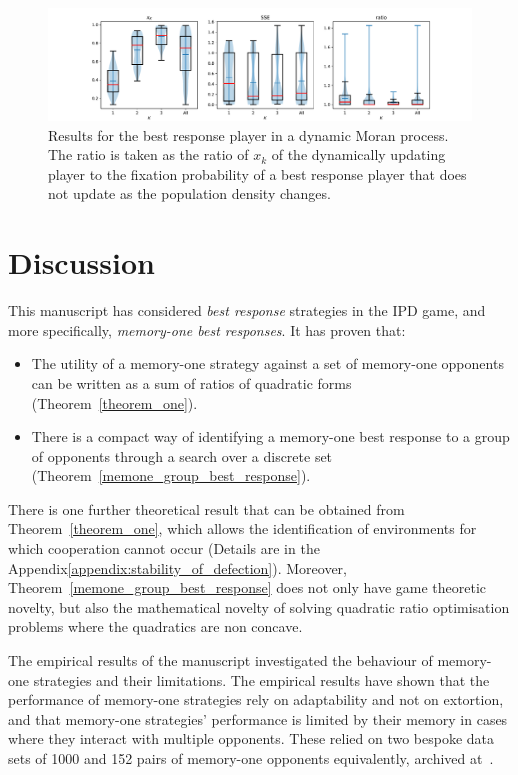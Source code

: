 \documentclass[10pt]{article}
\begin{document}
\begin{figure}[!hbtp]
    \centering
    \includegraphics[width=.9\textwidth]{img/dynamic_moran_process_results/main.pdf}
    \caption{Results for the best response player in a dynamic Moran process.
    The ratio is taken as the ratio of \(x_k\) of the dynamically updating
    player to the fixation probability of a best response player that does not
    update as the population density changes.}\label{fig:dynamic_moran_process_results}
\end{figure}


\section{Discussion}

This manuscript has considered \textit{best response} strategies in the IPD game, and
more specifically, \textit{memory-one best responses}. It has proven that:

\begin{itemize}
    \item The utility
          of a memory-one strategy against a set of memory-one opponents can be written as a sum
          of ratios of quadratic forms (Theorem~\ref{theorem_one}).
    \item There is a compact way of identifying a memory-one best response to a
        group of opponents through a search over a discrete set
        (Theorem~\ref{memone_group_best_response}).
\end{itemize}

There is one further theoretical result that can be obtained from Theorem~\ref{theorem_one}, 
which allows the identification of 
environments for which cooperation cannot occur (Details are in the
Appendix\ref{appendix:stability_of_defection}). Moreover,
Theorem~\ref{memone_group_best_response} does not only have game theoretic
novelty, but also the mathematical novelty of solving quadratic ratio
optimisation problems where the quadratics are non concave.

The empirical results of the manuscript investigated the behaviour of memory-one
strategies and their limitations. The empirical results have shown that the
performance of memory-one strategies rely on adaptability and not on extortion,
and that memory-one strategies' performance is limited by their memory in cases
where they interact with multiple opponents. These relied on two bespoke
data sets of 1000 and 152 pairs of memory-one opponents equivalently, archived
at~\cite{glynatsi2019}.
\end{document}
